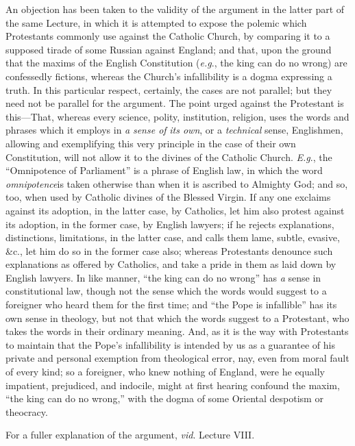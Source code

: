 An objection has been taken to the validity of the
argument in the latter part of the same Lecture, in which
it is attempted to expose the polemic which Protestants
commonly use against the Catholic Church, by comparing it
to a supposed tirade of some Russian against England; and
that, upon the ground that the maxims of the English
Constitution (\emph{e.g}., the king can do no wrong) are
confessedly fictions, whereas the Church's infallibility
is a dogma expressing a truth. In this particular
respect, certainly, the cases are not parallel; but they
need not be parallel for the argument. The point urged
against the Protestant is this—That, whereas every
science, polity, institution, religion, uses the words
and phrases which it employs in \emph{a} \emph{sense of} \emph{its
own}, or a \emph{technical} sense, Englishmen,
allowing and exemplifying this very principle in the case
of their own Constitution, will not allow it to the
divines of the Catholic Church. \emph{E.g}., the
``Omnipotence of Parliament'' is a phrase of
English law, in which the word \emph{omnipotence}is
taken otherwise than when it is ascribed to Almighty God;
and so, too, when used by Catholic divines of the Blessed
Virgin. If any one exclaims against its adoption, in the
latter case, by Catholics, let him also protest against
its adoption, in the former case, by English lawyers; if
he rejects explanations, distinctions, limitations, in
the latter case, and calls them lame, subtle, evasive,
\&c., let him do so in the former case also; whereas
Protestants denounce such explanations as offered by
Catholics, and take a pride in them as laid down by
English lawyers. In like manner, ``the king can do no
wrong'' has \emph{a} sense in constitutional law,
though not the sense which the words would suggest to a
foreigner who heard them for the first time; and
``the Pope is infallible'' has its own sense in
theology, but not that which the words suggest to a
Protestant, who takes the words in their ordinary
meaning. And, as it is the way with Protestants to
maintain that the Pope's infallibility is intended by us
as a guarantee of his private and personal exemption from
theological error, nay, even from moral fault of every
kind; so a foreigner, who knew nothing of England, were
he equally impatient, prejudiced, and indocile, might at
first hearing confound the maxim, ``the king can do
no wrong,'' with the dogma of some Oriental despotism
or theocracy.


For a fuller explanation of the argument, \emph{vid}.
Lecture VIII.


